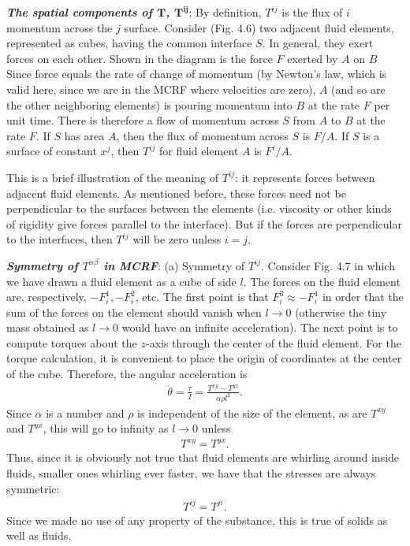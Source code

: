 \documentclass[11pt,letterpaper]{book}
\begin{document}
    \textbf{\textit{The spatial components of \(\mathbf{T}\), \(\mathbf{T^{ij}}\)}}: By definition, \(T^{ij}\) is the flux of \(i\) momentum across the \(j\) surface. Consider (Fig. 4.6) two adjacent fluid elements, represented as cubes, having the common interface \(S\). In general, they exert forces on each other. Shown in the diagram is the force \(F\) exerted by \(A\) on \(B\) Since force equals the rate of change of momentum (by Newton’s law, which is valid here, since we are in the MCRF where velocities are zero), \(A\) (and so are the other neighboring elements) is pouring momentum into \(B\) at the rate \(F\) per unit time.  There is therefore a flow of momentum across \(S\) from \(A\) to \(B\) at the rate \(F\). If \(S\) has area \(A\), then the flux of momentum across \(S\) is \(F/A\). If \(S\) is a surface of constant \(x^j\), then \(T^{ij}\) for fluid element \(A\) is \(F^i / A\).

    This is a brief illustration of the meaning of \(T^{ij}\): it represents forces between adjacent fluid elements. As mentioned before, these forces need not be perpendicular to the surfaces between the elements (i.e. viscosity or other kinds of rigidity give forces parallel to the interface). But if the forces are perpendicular to the interfaces, then \(T^{ij}\) will be zero unless \(i = j\). 

    \textbf{\textit{Symmetry of \(T^{\alpha \beta}\) in MCRF}}:
    (a) Symmetry of \(T^{ij}\). Consider Fig. 4.7 in which we have drawn a fluid element as a cube of side \(l\). The forces on the fluid element are, respectively, \(-F_i^1, -F_i^2\), etc. The first point is that \(F_i^3 \approx -F_i^1\) in order that the sum of the forces on the element should vanish when \(l \to 0\) (otherwise the tiny mass obtained as \(l \to 0\) would have an infinite acceleration). The next point is to compute torques about the \(z\)-axis through the center of the fluid element. For the torque calculation, it is convenient to place the origin of coordinates at the center of the cube. Therefore, the angular acceleration is
    \begin{align}
    \ddot{\theta} = \frac{\tau}{I} = \frac{T^{xy} - T^{yx}}{\alpha \rho l^2}. \tag{4.28}
    \end{align}
    Since \(\alpha\) is a number and \(\rho\) is independent of the size of the element, as are \(T^{xy}\) and \(T^{yx}\), this will go to infinity as \(l \to 0\) unless
    \begin{align}
    T^{xy} = T^{yx}.
    \end{align}
    Thus, since it is obviously not true that fluid elements are whirling around inside fluids, smaller ones whirling ever faster, we have that the stresses are always symmetric:
    \begin{align}
    T^{ij} = T^{ji}. \tag{4.29}
    \end{align}
    Since we made no use of any property of the substance, this is true of solids as well as fluids.
    
\end{document}
